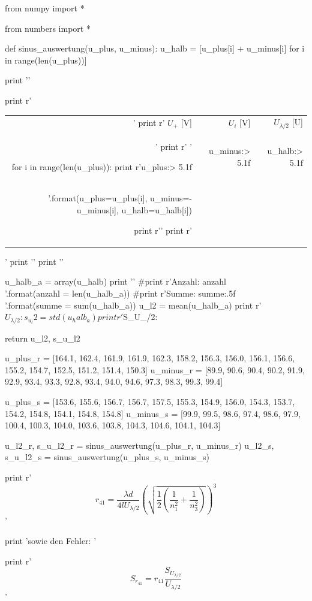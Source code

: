 \begin{python}
from numpy import *

from numbers import *

def sinus_auswertung(u_plus, u_minus):
  u_halb = [u_plus[i] + u_minus[i] for i in range(len(u_plus))]

  print '\n'

  print r'\begin{tabular}{rrr} \toprule'
  print r' $U_+$ [V] & $U_i$ [V] & $U_{\lambda/2}$ [U] \\'
  print r' \midrule '

  for i in range(len(u_plus)):
    print r'{u_plus:> 5.1f}&{u_minus:> 5.1f}&{u_halb:> 5.1f}\\'.format(u_plus=u_plus[i], u_minus=-u_minus[i], u_halb=u_halb[i])

  print r'\bottomrule '
  print r'\end{tabular}'
  print '\n'
  print '\n'

  u_halb_a = array(u_halb)
  print '\n'
  #print r'Anzahl: {anzahl} \\'.format(anzahl = len(u_halb_a))
  #print r'Summe: {summe:.5f}\\'.format(summe = sum(u_halb_a))
  u_l2 = mean(u_halb_a)
  print r'$U_{\lambda/2}: %
  s_u_l2 = std(u_halb_a)
  print r'$S_{U_{\lambda/2}}: %

  return u_l2, s_u_l2

  

u_plus_r  = [164.1, 162.4, 161.9, 161.9, 162.3, 158.2, 156.3, 156.0, 156.1, 156.6, 155.2, 154.7, 152.5, 151.2, 151.4, 150.3]
u_minus_r = [89.9, 90.6, 90.4, 90.2, 91.9, 92.9, 93.4, 93.3, 92.8, 93.4, 94.0, 94.6, 97.3, 98.3, 99.3, 99.4]

u_plus_s = [153.6, 155.6, 156.7, 156.7, 157.5, 155.3, 154.9, 156.0, 154.3, 153.7, 154.2, 154.8, 154.1, 154.8, 154.8]
u_minus_s = [99.9, 99.5, 98.6, 97.4, 98.6, 97.9, 100.4, 100.3, 104.0, 103.6, 103.8, 104.3, 104.6, 104.1, 104.3]  

u_l2_r, s_u_l2_r = sinus_auswertung(u_plus_r, u_minus_r)
u_l2_s, s_u_l2_s = sinus_auswertung(u_plus_s, u_minus_s)

print r'$$ r_{41} = \frac{\lambda d}{4l U_{\lambda / 2}} \left(  \sqrt{\frac{1}{2} \left( \frac{1}{n_1^2} + \frac{1}{n_3^2} \right)} \right)^3 $$'

print 'sowie den Fehler: '

print r'$$S_{r_{41}} = r_{41} \frac{S_{U_{\lambda/2}}}{U_{\lambda/2}} $$'


\end{python}
